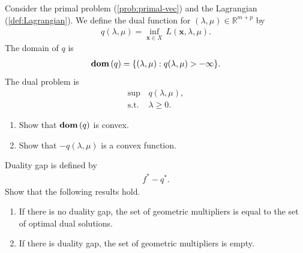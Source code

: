 \documentclass[11pt,letter,notitlepage]{article}
\DeclareMathOperator*{\dom}{\bf dom\,}
\begin{document}
\newpage
\begin{exercise}
	Consider the primal problem (\ref{prob:primal-vec}) and the Lagrangian (\ref{def:Lagrangian}). We define the dual function for $(\lambda,\mu)\in\mathbb{R}^{m+p}$ by
	\begin{align*}
		q(\lambda,\mu)=\inf_{\mathbf{x}\in X}\,L(\mathbf{x},\lambda,\mu).
	\end{align*}
	The domain of $q$ is
	\begin{align*}
		\dom(q)=\{(\lambda,\mu):q(\lambda,\mu)>-\infty\}.
	\end{align*}
	The dual problem is
	\begin{align*}
		\sup\,       & q(\lambda,\mu), \\
		\mbox{s.t. } & \lambda\geq0.
	\end{align*}
	\begin{enumerate}
		\item Show that $\dom(q)$ is convex.
		\item Show that $-q(\lambda,\mu)$ is a convex function.
	\end{enumerate}
\end{exercise}





\newpage
\begin{exercise}
	Duality gap is defined by
	\begin{align*}
		f^*-q^*.
	\end{align*}
	Show that the following results hold.
	\begin{enumerate}
		\item If there is no duality gap, the set of geometric multipliers is equal to the set of optimal dual solutions.
		\item If there is duality gap, the set of geometric multipliers is empty.
	\end{enumerate}
\end{exercise}
\end{document}
